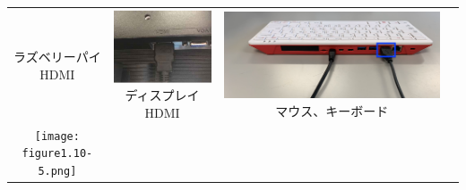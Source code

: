 \documentclass[dvipdfmx]{beamer}
\begin{document}
\begin{frame}[fragile]
\begin{tabular}{cccc}
\begin{minipage}{0.23\textwidth}
{                      \newline
                      ラズベリーパイ HDMI}
			\end{minipage} &
			\begin{minipage}{0.23\textwidth}
                    {\upshape
                      \includegraphics[width=\textwidth]{textbook-img016.png}
                      \newline
                      ディスプレイHDMI}
			\end{minipage}&
  \begin{minipage}{0.23\textwidth}
    {\upshape
      \includegraphics[width=\textwidth]{figure1.10-4.png}
      \newline
      マウス、キーボード}
  \end{minipage}\\
		 \begin{minipage}{0.23\textwidth}
                    {\upshape
                      \texttt{[image: figure1.10-5.png]}
                      \newline
}
\end{minipage}
\end{tabular}
\end{frame}
\end{document}
